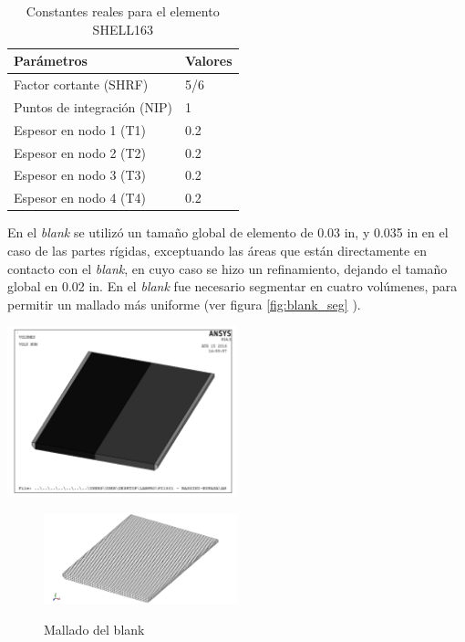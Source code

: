 \begin{table}[h]
\centering
\caption{Constantes reales para el elemento SHELL163}
\label{}
\begin{tabular}{p{6cm} p{3cm}} \hline
Parámetros & Valores \\
\hline
Factor cortante (SHRF) & 5/6 \\
Puntos de integración (NIP) & 1 \\
Espesor en nodo 1 (T1) & 0.2 \\
Espesor en nodo 2 (T2) & 0.2 \\
Espesor en nodo 3 (T3) & 0.2 \\
Espesor en nodo 4 (T4) & 0.2 \\
\hline
\end{tabular}
\label{tab:shell_param}
\end{table}


En el \textit{blank} se utilizó un tamaño global de elemento de 0.03 in, y 0.035 in en el caso de las partes 
rígidas, exceptuando las áreas que están directamente en contacto con el \textit{blank}, en cuyo caso se hizo 
un refinamiento, dejando el tamaño global en 0.02 in. En el \textit{blank} fue necesario segmentar en cuatro 
volúmenes, para permitir un mallado más uniforme (ver figura \ref{fig:blank_seg} ).


\begin{center}
\includegraphics[width=0.5\textwidth]{src/ch3/blank_segmentado.pdf}
\label{fig:blank_seg}
\end{center}




\begin{figure}[H]
\centering
\includegraphics[width=0.5\textwidth]{src/ch3/mesh_blank.png}
\label{fig:mesh_blank}
\caption{Mallado del blank}
\end{figure}


